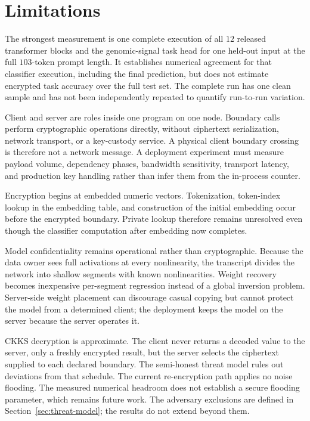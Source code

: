 
\section{Limitations}
\label{sec:limitations}

The strongest measurement is one complete execution of all $12$ released transformer blocks and
the genomic-signal task head for one held-out input at the full $103$-token prompt length. It
establishes numerical agreement for that classifier execution, including the final prediction, but
does not estimate encrypted task accuracy over the full test set. The complete run has one clean
sample and has not been independently repeated to quantify run-to-run variation.

Client and server are roles inside one program on one node. Boundary calls perform cryptographic
operations directly, without ciphertext serialization, network transport, or a key-custody service.
A physical client boundary crossing is therefore not a network message. A deployment experiment
must measure payload volume, dependency phases, bandwidth sensitivity, transport latency, and
production key handling rather than infer them from the in-process counter.

Encryption begins at embedded numeric vectors. Tokenization, token-index lookup in the embedding
table, and construction of the initial embedding occur before the encrypted boundary. Private
lookup therefore remains unresolved even though the classifier computation after embedding now
completes.

Model confidentiality remains operational rather than cryptographic. Because the data owner sees
full activations at every nonlinearity, the transcript divides the network into shallow segments
with known nonlinearities. Weight recovery becomes inexpensive per-segment regression instead of a
global inversion problem. Server-side weight placement can discourage casual copying but cannot
protect the model from a determined client; the deployment keeps the model on the server because
the server operates it.

CKKS decryption is approximate. The client never returns a decoded value to the server, only a
freshly encrypted result, but the server selects the ciphertext supplied to each declared boundary.
The semi-honest threat model rules out deviations from that schedule. The current re-encryption
path applies no noise flooding. The measured numerical headroom does not establish a secure
flooding parameter, which remains future work. The adversary exclusions are defined in
Section~\ref{sec:threat-model}; the results do not extend beyond them.
